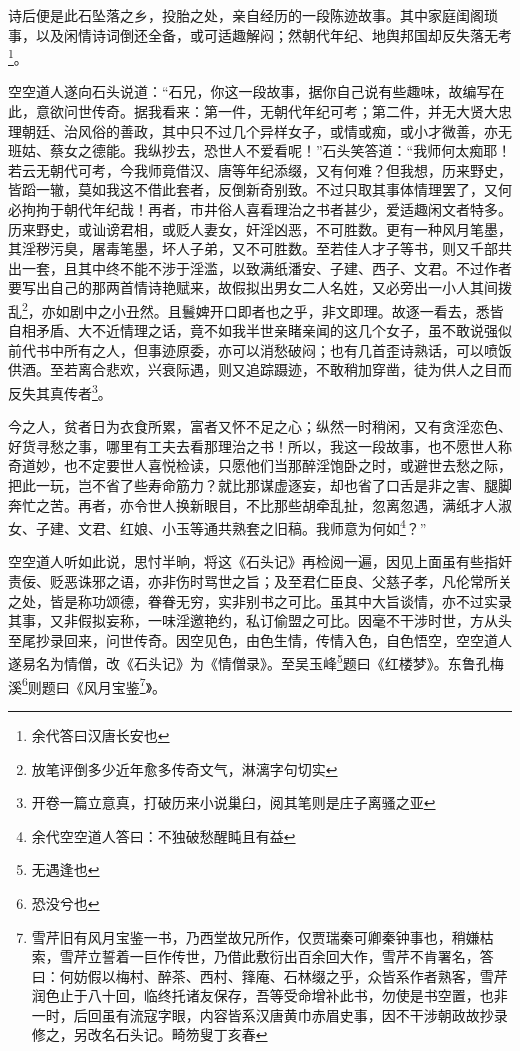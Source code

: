 \documentclass[12pt,oneside]{book}
\begin{document}
诗后便是此石坠落之乡，投胎之处，亲自经历的一段陈迹故事。其中家庭闺阁琐事，以及闲情诗词倒还全备，或可适趣解闷；然朝代年纪、地舆邦国却反失落无考\footnote{余代答曰汉唐长安也}。

空空道人遂向石头说道：“石兄，你这一段故事，据你自己说有些趣味，故编写在此，意欲问世传奇。据我看来：第一件，无朝代年纪可考；第二件，并无大贤大忠理朝廷、治风俗的善政，其中只不过几个异样女子，或情或痴，或小才微善，亦无班姑、蔡女之德能。我纵抄去，恐世人不爱看呢！”石头笑答道：“我师何太痴耶！若云无朝代可考，今我师竟借汉、唐等年纪添缀，又有何难？但我想，历来野史，皆蹈一辙，莫如我这不借此套者，反倒新奇别致。不过只取其事体情理罢了，又何必拘拘于朝代年纪哉！再者，市井俗人喜看理治之书者甚少，爱适趣闲文者特多。历来野史，或讪谤君相，或贬人妻女，奸淫凶恶，不可胜数。更有一种风月笔墨，其淫秽污臭，屠毒笔墨，坏人子弟，又不可胜数。至若佳人才子等书，则又千部共出一套，且其中终不能不涉于淫滥，以致满纸潘安、子建、西子、文君。不过作者要写出自己的那两首情诗艳赋来，故假拟出男女二人名姓，又必旁出一小人其间拨乱\footnote{放笔评倒多少近年愈多传奇文气，淋漓字句切实}，亦如剧中之小丑然。且鬟婢开口即者也之乎，非文即理。故逐一看去，悉皆自相矛盾、大不近情理之话，竟不如我半世亲睹亲闻的这几个女子，虽不敢说强似前代书中所有之人，但事迹原委，亦可以消愁破闷；也有几首歪诗熟话，可以喷饭供酒。至若离合悲欢，兴衰际遇，则又追踪蹑迹，不敢稍加穿凿，徒为供人之目而反失其真传者\footnote{开卷一篇立意真，打破历来小说巢臼，阅其笔则是庄子离骚之亚}。

今之人，贫者日为衣食所累，富者又怀不足之心；纵然一时稍闲，又有贪淫恋色、好货寻愁之事，哪里有工夫去看那理治之书！所以，我这一段故事，也不愿世人称奇道妙，也不定要世人喜悦检读，只愿他们当那醉淫饱卧之时，或避世去愁之际，把此一玩，岂不省了些寿命筋力？就比那谋虚逐妄，却也省了口舌是非之害、腿脚奔忙之苦。再者，亦令世人换新眼目，不比那些胡牵乱扯，忽离忽遇，满纸才人淑女、子建、文君、红娘、小玉等通共熟套之旧稿。我师意为何如\footnote{余代空空道人答曰：不独破愁醒盹且有益}？”

空空道人听如此说，思忖半晌，将这《石头记》再检阅一遍，因见上面虽有些指奸责佞、贬恶诛邪之语，亦非伤时骂世之旨；及至君仁臣良、父慈子孝，凡伦常所关之处，皆是称功颂德，眷眷无穷，实非别书之可比。虽其中大旨谈情，亦不过实录其事，又非假拟妄称，一味淫邀艳约，私订偷盟之可比。因毫不干涉时世，方从头至尾抄录回来，问世传奇。因空见色，由色生情，传情入色，自色悟空，空空道人遂易名为情僧，改《石头记》为《情僧录》。至吴玉峰\footnote{无遇逢也}题曰《红楼梦》。东鲁孔梅溪\footnote{恐没兮也}则题曰《风月宝鉴\footnote{雪芹旧有风月宝鉴一书，乃西堂故兄所作，仅贾瑞秦可卿秦钟事也，稍嫌枯索，雪芹立誓着一巨作传世，乃借此敷衍出百余回大作，雪芹不肯署名，答曰：何妨假以梅村、醉茶、西村、箨庵、石林缀之乎，众皆系作者熟客，雪芹润色止于八十回，临终托诸友保存，吾等受命增补此书，勿使是书空置，也非一时，后回虽有流寇字眼，内容皆系汉唐黄巾赤眉史事，因不干涉朝政故抄录修之，另改名石头记。畸笏叟丁亥春}》。
\end{document}
